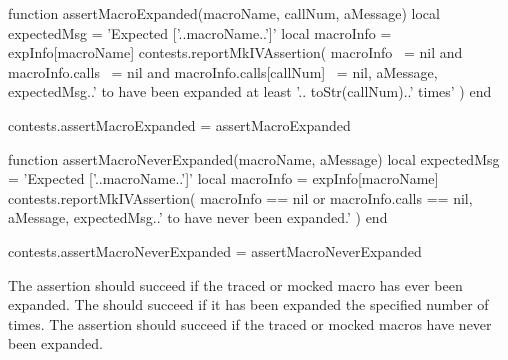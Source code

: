 \startLuaCode
function assertMacroExpanded(macroName, callNum, aMessage)
  local expectedMsg = 'Expected ['..macroName..']'
  local macroInfo   = expInfo[macroName]
  contests.reportMkIVAssertion(
    macroInfo ~= nil
    and macroInfo.calls ~= nil
    and macroInfo.calls[callNum] ~= nil,
    aMessage,
    expectedMsg..' to have been expanded at least '..
      toStr(callNum)..' times'
  )
end

contests.assertMacroExpanded = assertMacroExpanded

function assertMacroNeverExpanded(macroName, aMessage)
  local expectedMsg = 'Expected ['..macroName..']'
  local macroInfo   = expInfo[macroName]
  contests.reportMkIVAssertion(
    macroInfo == nil
    or macroInfo.calls == nil,
    aMessage,
    expectedMsg..' to have never been expanded.'
  )
end

contests.assertMacroNeverExpanded = assertMacroNeverExpanded
\stopLuaCode


The \type{\assertMacroExpanded} assertion should succeed if the traced or 
mocked macro has ever been expanded. The \type{\assertMacroExpandedNTimes} 
should succeed if it has been expanded the specified number of times. The 
\type{\assertMacroeverExpanded} assertion should succeed if the traced or 
mocked macros have never been expanded. 

\startConTest
\begingroup
  \aTexMockZeroArgs
  \startAssertShouldFail{}{}{}
  \stopAssertShouldFail
\endgroup
\stopConTest

\stopTestCase

\startConTest
\begingroup
  \startAssertShouldFail{}{}{}
  \stopAssertShouldFail
  \aContextMock
  \startAssertShouldFail{}{}{}
  \stopAssertShouldFail
  \startAssertShouldFail{}{}{}
  \stopAssertShouldFail
\endgroup
\stopConTest
\stopTestCase
\stopTestSuite

\startTestSuite[assertMacroNthArgumentOnMthExpansionMatches]

\startMkIVCode
\def\assertMacroNthArgumentOnMthExpansionMatches#1#2#3#4#5{%
  \directlua{%
    thirddata.contests.assertMacroArguments(
      '#1', #3, #2, '#4', '#5'
    )
  }
}
\stopMkIVCode


